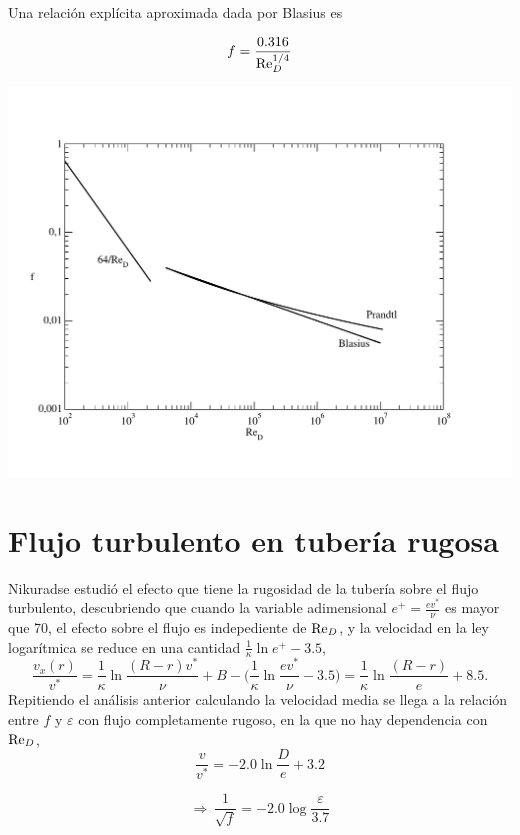 Una relación explícita aproximada dada por Blasius es

\begin{equation}
	f = \frac{0.316}{\text{Re}_D^{1/4}}
\end{equation}

\begin{center}
	\includegraphics[scale=.45]{TeX_files/chapter10-Tuberias/f1.pdf}
\end{center}

\section{Flujo turbulento en tubería rugosa}

Nikuradse estudió el efecto que tiene la rugosidad de la tubería sobre el flujo turbulento, descubriendo que cuando la variable adimensional
$e^+ = \frac{e v^*}{\nu}$ es mayor que 70, el efecto sobre el flujo es indepediente de $\text{Re}_D$, y la velocidad en la ley logarítmica se reduce en una cantidad $\frac{1}{\kappa}\ln e^+ - 3.5$,
\[
\frac{v_x(r)}{v^*} = \frac{1}{\kappa}\ln \frac{(R-r) v^*}{\nu} + B - \bigl( \frac{1}{\kappa}\ln \frac{e v^*}{\nu}- 3.5\bigr) = \frac{1}{\kappa}\ln \frac{(R-r)}{e} + 8.5.
\]
Repitiendo el análisis anterior calculando  la velocidad media se llega a la relación entre $f$ y $\varepsilon$ con flujo completamente rugoso, en la que no hay dependencia con $\text{Re}_D$,
\[
\frac{v}{v^*} = -2.0\ln \frac{D}{e} + 3.2
\]

\begin{equation}
	\Rightarrow \,
\boxed{
	\frac{1}{\sqrt{f}} = -2.0 \log \frac{\varepsilon}{3.7}
}
\end{equation}

